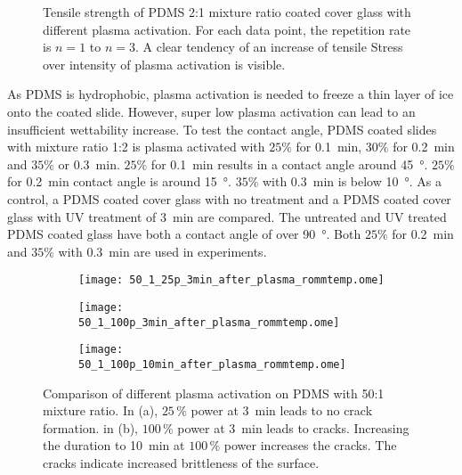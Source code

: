 \begin{figure}[hbt!]
	\centering
	
	\caption{Tensile strength of PDMS 2:1 mixture ratio coated cover glass with different plasma activation. For each data point, the repetition rate is $n = 1$ to $ n =3$. A clear tendency of an increase of tensile Stress over intensity of plasma activation is visible.}
	\label{fig:PlotPlasmaAktivierung}
\end{figure}

As PDMS is hydrophobic, plasma activation is needed to freeze a thin layer of ice onto the coated slide. However, super low plasma activation can lead to an insufficient wettability increase. To test the contact angle,  PDMS coated slides with mixture ratio 1:2 is plasma activated with $25\%$ for \SI{0.1}{\minute}, $30\%$ for \SI{0.2}{\minute} and $35\%$ or \SI{0.3}{\minute}. $25\%$ for \SI{0.1}{\minute} results in a contact angle around \SI{45}{\degree}. $25\%$ for \SI{0.2}{\minute} contact angle is around \SI{15}{\degree}. $35\%$ with \SI{0.3}{\minute} is below \SI{10}{\degree}. As a control, a PDMS coated cover glass with no treatment and a PDMS coated cover glass with UV treatment of \SI{3}{\minute} are compared. The untreated and UV treated PDMS coated glass have both a contact angle of over \SI{90}{\degree}. Both $25\%$ for \SI{0.2}{\minute} and $35\%$ with \SI{0.3}{\minute} are used in experiments.


\begin{figure}[hbt!]
	\centering
	\begin{subfigure}[]{0.45\textwidth}
		\centering
		\texttt{[image: 50\_1\_25p\_3min\_after\_plasma\_rommtemp.ome]}
		\caption{}
	\end{subfigure}
	\begin{subfigure}[]{0.45\textwidth}
		\centering
		\texttt{[image: 50\_1\_100p\_3min\_after\_plasma\_rommtemp.ome]}
		\caption{}
	\end{subfigure}
	\begin{subfigure}[]{0.45\textwidth}
		\centering
		\texttt{[image: 50\_1\_100p\_10min\_after\_plasma\_rommtemp.ome]}
		\caption{}
	\end{subfigure}
	\caption{Comparison of different plasma activation on PDMS with 50:1 mixture ratio. In (a), $25\,\%$ power at \SI{3}{\minute} leads to no crack formation. in (b), $100\,\%$ power at \SI{3}{\minute} leads to cracks. Increasing the duration to \SI{10}{\minute} at $100\,\%$ power increases the cracks. The cracks indicate increased brittleness of the surface.}
	\label{fig:Vgl50:1Plasma}
\end{figure}

